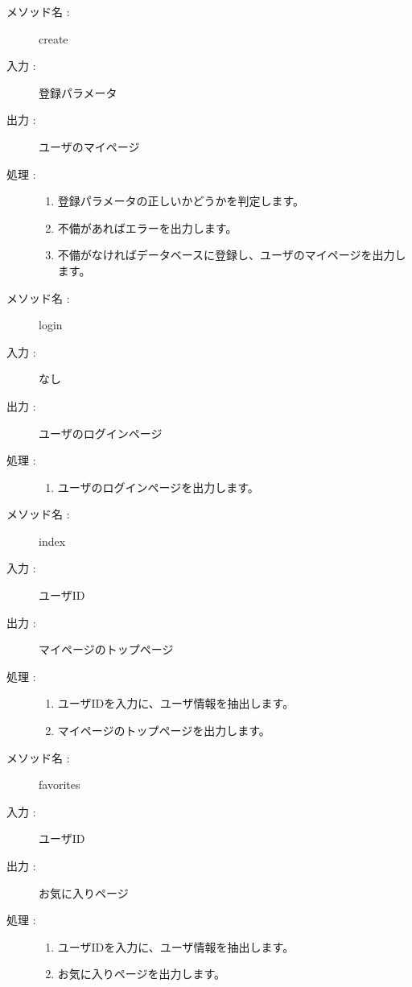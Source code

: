 \documentclass[a4j,titlepage]{jarticle}
\begin{document}
\begin{description}
\item [メソッド名 :] create
\item [入力 :] 登録パラメータ
\item [出力 :] ユーザのマイページ
\item [処理 :]\mbox{}
  \begin{enumerate}
  \item 登録パラメータの正しいかどうかを判定します。
  \item 不備があればエラーを出力します。
  \item 不備がなければデータベースに登録し、ユーザのマイページを出力します。
  \end{enumerate}
\end{description}

\begin{description}
\item [メソッド名 :] login
\item [入力 :] なし
\item [出力 :] ユーザのログインページ
\item [処理 :]\mbox{}
  \begin{enumerate}
 \item ユーザのログインページを出力します。
 \end{enumerate}
\end{description}

\begin{description}
\item [メソッド名 :] index
\item [入力 :] ユーザID
\item [出力 :] マイページのトップページ
\item [処理 :]\mbox{}
  \begin{enumerate}
  \item ユーザIDを入力に、ユーザ情報を抽出します。
  \item マイページのトップページを出力します。
 \end{enumerate}
\end{description}

\begin{description}
\item [メソッド名 :] favorites
\item [入力 :] ユーザID
\item [出力 :] お気に入りページ
\item [処理 :]\mbox{}
  \begin{enumerate}
  \item ユーザIDを入力に、ユーザ情報を抽出します。
  \item お気に入りページを出力します。
 \end{enumerate}
\end{description}
\end{document}
